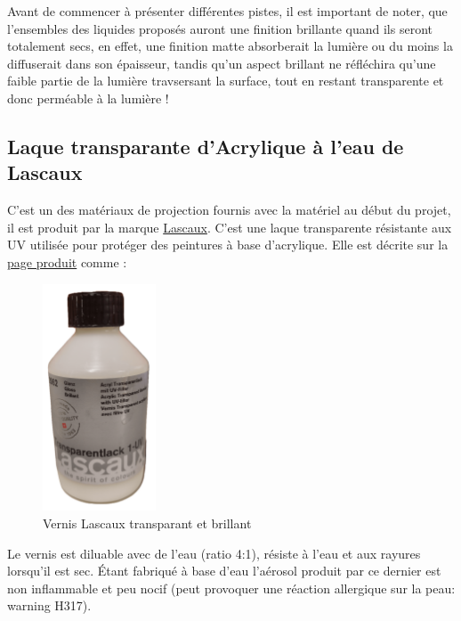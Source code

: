Avant de commencer à présenter différentes pistes, il est important de noter, que l'ensembles des liquides proposés auront une finition brillante
quand ils seront totalement secs, en effet, une finition matte absorberait la lumière ou du moins la diffuserait dans son épaisseur, tandis qu'un aspect brillant
ne réfléchira qu'une faible partie de la lumière travsersant la surface, tout en restant transparente et donc perméable à la lumière !
\subsection{Laque transparante d'Acrylique à l'eau de Lascaux}

C'est un des matériaux de projection fournis avec la matériel au début du projet, il est produit par la marque \href{https://lascaux.ch/en/start}{Lascaux}\footnotemark {}.
C'est une laque transparente résistante aux UV utilisée pour protéger des peintures à base d'acrylique. Elle est décrite sur la \href{https://lascaux.ch/lascaux-varnishes-and-fixative/lascaux-transparent-varnish-1-uv-gloss}{page produit}\footnotemark
comme :

\begin{figure}[H]
    \centering
    \includegraphics[width=0.3\textwidth]{assets/figures/etat_art/Lascaux_vernis_brillant.png}
    \caption[Vernis Lascaux transparant et brillant]{Vernis Lascaux transparant et brillant}
\end{figure}
Le vernis est diluable avec de l'eau (ratio 4:1), résiste à l'eau et aux rayures lorsqu'il est sec. Étant fabriqué à base d'eau
l'aérosol produit par ce dernier est non inflammable et peu nocif (peut provoquer une réaction allergique sur la peau: warning H317).

